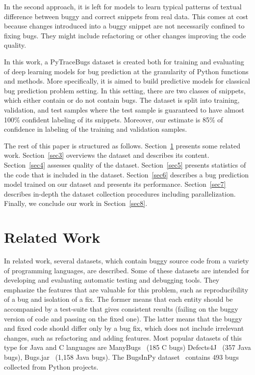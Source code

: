 \documentclass[10pt,conference]{IEEEtran}
\begin{document}
In the second approach, it is left for models to learn typical patterns of textual difference between buggy and correct snippets from real data. This comes at cost because changes introduced into a buggy snippet are not necessarily confined to 
fixing bugs. They might include refactoring or other changes improving the code quality.

In this work, a PyTraceBugs dataset is created both for training and evaluating of deep learning models for bug prediction
at the granularity of Python functions and methods. More specifically, it is aimed to build predictive models for classical bug prediction problem setting. In this setting, there are two classes
of snippets, which either contain or do not contain bugs. 
The dataset is split into training, validation, and test samples where the test sample is guaranteed to have almost 100\% confident labeling of its snippets.
Moreover, our estimate is 85\% of confidence in labeling of the training and validation samples.

The rest of this paper is structured as follows. Section~\ref{sec2} presents some related work. Section~\ref{sec3} overviews the dataset and describes its content. Section~\ref{sec4} assesses quality of the dataset. Section~\ref{sec5} presents statistics of the code that is included in the dataset. Section~\ref{sec6} describes a bug prediction model trained on our dataset and presents its performance. Section~\ref{sec7} describes in-depth the dataset collection procedures including parallelization.  Finally, we conclude our work in Section~\ref{sec8}.

\section{Related Work}\label{sec2}

In related work, several datasets, which contain buggy source code from a variety of programming languages, are described.
Some of these datasets are intended for developing and evaluating automatic testing and debugging tools. 
They emphasize the features that are valuable for this problem, such as reproducibility of a bug and isolation of a fix. 
The former means that each entity should be accompanied by a test-suite that gives consistent results (failing on the buggy version of code and passing on the fixed one). 
The latter means that the buggy and fixed code should differ only by a bug fix, which does not include irrelevant changes, such as refactoring and adding features.
Most popular datasets of this type for Java and C languages are ManyBugs~\cite{Goues2015manybugs} (185 C bugs) Defects4J~\cite{just2014defects4j} (357 Java bugs), Bugs.jar~\cite{SahaEtAl2018bugsjar} (1,158 Java bugs). 
The BugsInPy dataset~\cite{WidyasariEtAl2020} contains 493 bugs collected from Python projects.
\end{document}
